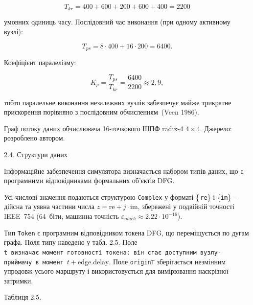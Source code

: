 \documentclass[
]{article}
\begin{document}
\[T_{kr} = 400 + 600 + 200 + 600 + 400 = 2200\]

умовних одиниць часу. Послідовний час виконання (при одному активному
вузлі):

\[T_{ps} = 8 \cdot 400 + 16 \cdot 200 = 6400.\]

Коефіцієнт паралелізму:

\[K_{p} = \frac{T_{ps}}{T_{kr}} = \frac{6400}{2200} \approx 2,9,\]

тобто паралельне виконання незалежних вузлів забезпечує майже трикратне
прискорення порівняно з послідовним обчисленням~(Veen 1986).

Граф потоку даних обчислювача 16-точкового ШПФ radix-4 \(4 \times 4\).
Джерело: розроблено автором.

\protect{}\label{_Toc228121462}{}2.4. Структури даних

Інформаційне забезпечення симулятора визначається набором типів даних,
що є програмними відповідниками формальних об'єктів DFG.

Усі числові значення подаються структурою \texttt{Complex} у форматі
\{ \texttt{re}\} і \{\texttt{im}\} -- дійсна та уявна частини числа
\(z = \text{re} + j \cdot \text{im}\), збережені у подвійній точності
IEEE~754 (64~біти, машинна точність
\(\varepsilon_{mach} \approx 2.22 \cdot 10^{- 16}\)).

Тип \texttt{Token} є програмним відповідником токена DFG, що
переміщується по дугам графа. Поля типу наведено у табл. 2.5. Поле
\texttt{t\ }\texttt{визначає\ момент\ готовності\ токена:\ він\ стає\ доступним\ вузлу-приймачу\ в\ момент\ }\(t + \text{edge.delay}\).
Поле \texttt{originT} зберігається незмінним упродовж усього маршруту і
використовується для вимірювання наскрізної затримки.

Таблиця 2.5.
\end{document}
